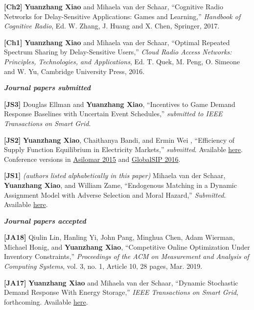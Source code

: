 \documentclass[margin,line]{res}
\begin{document}
\begin{resume}
\textbf{[Ch2]} {\bf Yuanzhang Xiao} and Mihaela van der Schaar, ``Cognitive Radio Networks for Delay-Sensitive Applications: Games and Learning,'' \emph{Handbook of Cognitive Radio}, Ed. W. Zhang, J. Huang and X. Chen, Springer, 2017.

\textbf{[Ch1]} {\bf Yuanzhang Xiao} and Mihaela van der Schaar, ``Optimal Repeated Spectrum Sharing by Delay-Sensitive Users,'' \emph{Cloud Radio Access Networks: Principles, Technologies, and Applications}, Ed. T. Quek, M. Peng, O. Simeone and W. Yu, Cambridge University Press, 2016.


{\em \textbf{Journal papers submitted}}

\vspace{-.3cm}

\textbf{[JS3]} Douglas Ellman and {\bf Yuanzhang Xiao}, ``Incentives to Game Demand Response Baselines with Uncertain Event Schedules,'' \emph{submitted to IEEE Transactions on Smart Grid}.

\textbf{[JS2]} {\bf Yuanzhang Xiao}, Chaithanya Bandi, and Ermin Wei , ``Efficiency of Supply Function Equilibrium in Electricity Markets,'' \emph{submitted}. Available \href{http://yuanzhangxiao.com/papers/XYZ-Bandi-Wei-Submitted2016.pdf}{here}. Conference versions in \href{http://yuanzhangxiao.com/papers/XYZ-Bandi-Wei-Asilomar2015.pdf}{Asilomar 2015} and \href{http://yuanzhangxiao.com/papers/XYZ-Bandi-Wei-GlobalSIP2016.pdf}{GlobalSIP 2016}.


\textbf{[JS1]} \emph{(authors listed alphabetically in this paper)} Mihaela van der Schaar, {\bf Yuanzhang Xiao}, and William Zame, ``Endogenous Matching in a Dynamic Assignment Model with Adverse Selection and Moral Hazard,'' \emph{Submitted}. Available \href{http://yuanzhangxiao.com/papers/VDS-XYZ-WZ-Submitted2016.pdf}{here}.


{\em \textbf{Journal papers accepted}}

\vspace{-.3cm}

\textbf{[JA18]}
Qiulin Lin, Hanling Yi, John Pang, Minghua Chen, Adam Wierman, Michael Honig, and {\bf Yuanzhang Xiao}, ``Competitive Online Optimization Under Inventory Constraints,'' \emph{Proceedings of the ACM on Measurement and Analysis of Computing Systems}, vol. 3, no. 1, Article 10, 28 pages, Mar. 2019.

\textbf{[JA17]} {\bf Yuanzhang Xiao} and Mihaela van der Schaar, ``Dynamic Stochastic Demand Response With Energy Storage,'' \emph{IEEE Transactions on Smart Grid}, forthcoming.  Available \href{http://arxiv.org/abs/1401.2185}{here}.


\end{resume}
\end{document}
